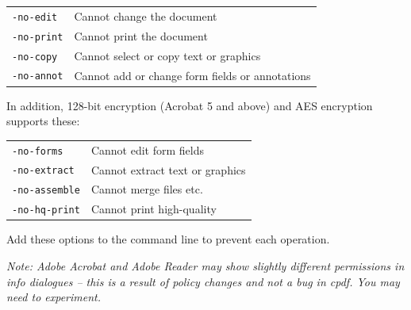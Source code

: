 \documentclass{book}
\begin{document}
   \vspace{2mm}
   \begin{tabular}{ll}
     \texttt{-no-edit} & Cannot change the document\\
     \texttt{-no-print} & Cannot print the document\\
     \texttt{-no-copy} & Cannot select or copy text or graphics\\
     \texttt{-no-annot} & Cannot add or change form fields or annotations\\
   \end{tabular}

   \vspace{2mm}
   \noindent In addition, 128-bit encryption (Acrobat 5 and above) and AES encryption supports these:

   \vspace{2mm}
   \begin{tabular}{ll}
     \texttt{-no-forms} & Cannot edit form fields\\
     \texttt{-no-extract} & Cannot extract text or graphics\\
     \texttt{-no-assemble} & Cannot merge files etc.\\
     \texttt{-no-hq-print} & Cannot print high-quality\\
   \end{tabular}

  \vspace{2mm}
  \noindent Add these options to the command line to prevent each operation.

  \vspace{2mm}
\noindent\textit{Note: Adobe Acrobat and Adobe Reader may show slightly different permissions in info dialogues -- this is a result of policy changes and not a bug in \textup{cpdf}. You may need to experiment.}

  \vspace{2mm}
\end{document}
